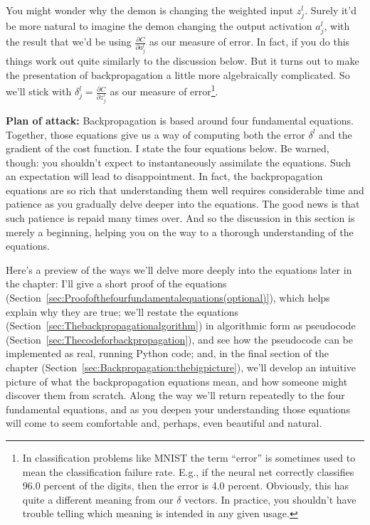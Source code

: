 You might wonder why the demon is changing the weighted input $z_{j}^{l}$. Surely it'd be more natural to imagine the demon changing the output activation $a^l_j$, with the result that we'd be using $\frac{\partial C}{\partial a_{j}^{l}}$ as our measure of error. In fact, if you do this things work out quite similarly to the discussion below. But it turns out to make the presentation of backpropagation a little more algebraically complicated. So we'll stick with $\delta_{j}^{l}=\frac{\partial C}{\partial z_{j}^{l}}$ as our measure of error\footnote{In classification problems like MNIST the term ``error'' is sometimes used to mean the classification failure rate. E.g., if the neural net correctly classifies 96.0 percent of the digits, then the error is 4.0 percent. Obviously, this has quite a different meaning from our $\delta$ vectors. In practice, you shouldn't have trouble telling which meaning is intended in any given usage.}.

\textbf{Plan of attack:} Backpropagation is based around four fundamental equations. Together, those equations give us a way of computing both the error $\delta^{l}$ and the gradient of the cost function. I state the four equations below. Be warned, though: you shouldn't expect to instantaneously assimilate the equations. Such an expectation will lead to disappointment. In fact, the backpropagation equations are so rich that understanding them well requires considerable time and patience as you gradually delve deeper into the equations. The good news is that such patience is repaid many times over. And so the discussion in this section is merely a beginning, helping you on the way to a thorough understanding of the equations.

Here's a preview of the ways we'll delve more deeply into the equations later in the chapter: I'll give a short proof of the equations (Section~\ref{sec:Proofofthefourfundamentalequations(optional)}), which helps explain why they are true; we'll restate the equations (Section~\ref{sec:Thebackpropagationalgorithm}) in algorithmic form as pseudocode (Section~\ref{sec:Thecodeforbackpropagation}), and see how the pseudocode can be implemented as real, running Python code; and, in the final section of the chapter (Section~\ref{sec:Backpropagation:thebigpicture}), we'll develop an intuitive picture of what the backpropagation equations mean, and how someone might discover them from scratch. Along the way we'll return repeatedly to the four fundamental equations, and as you deepen your understanding those equations will come to seem comfortable and, perhaps, even beautiful and natural.


